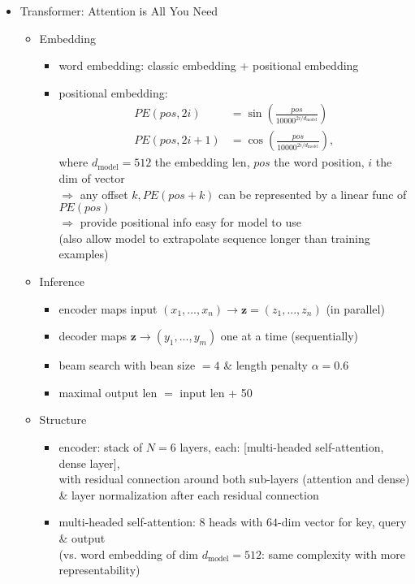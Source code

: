 \begin{itemize}
\item Transformer: Attention is All You Need
	\begin{itemize}
	\item Embedding
		\begin{itemize}
		\item word embedding: classic embedding + positional embedding
		\item positional embedding:
		\begin{align*} PE(pos, 2i) &= \sin\left( \frac{pos}{10000^{2i/d_\text{model}}} \right)  \\ PE(pos, 2i+1) &= \cos\left( \frac{pos}{10000^{2i/d_\text{model}}} \right), \end{align*} where $d_\text{model}=512$ the embedding len, $pos$ the word position, $i$ the dim of vector \\
		$\Rightarrow$ any offset $k, PE(pos+k)$ can be represented by a linear func of $PE(pos)$ \\
		$\Rightarrow$ provide positional info easy for model to use \\
		(also allow model to extrapolate sequence longer than training examples)
		\end{itemize}
	\item Inference
		\begin{itemize}
		\item encoder maps input $(x_1,...,x_n) \rightarrow \mathbf z=(z_1,...,z_n)$ (in parallel)
		\item decoder maps $\mathbf z \rightarrow (y_1,...,y_m)$ one at a time (sequentially)
		\item beam search with bean size $=4$ \& length penalty $\alpha=0.6$
		\item maximal output len $=$ input len + 50
		\end{itemize}
	\item Structure
		\begin{itemize}
		\item encoder: stack of $N=6$ layers, each: [multi-headed self-attention, dense layer], \\
		with residual connection around both sub-layers (attention and dense) \\
		\& layer normalization after each residual connection
		\item multi-headed self-attention: $8$ heads with $64$-dim vector for key, query \& output \\
		(vs. word embedding of dim $d_\text{model} = 512$: same complexity with more representability)

\end{itemize}
\end{itemize}
\end{itemize}
